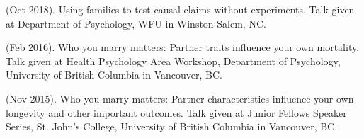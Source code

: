 \begin{etaremune}
%
%
\item\meb (Oct 2018). Using families to test causal claims without experiments. Talk given at Department of Psychology, WFU in Winston-Salem, NC.
%
\item \meb (Feb 2016). Who you marry matters: Partner traits influence your own mortality. Talk given at Health Psychology Area Workshop, Department of Psychology, University of British Columbia in Vancouver, BC. 
%
\item \meb (Nov 2015). Who you marry matters: Partner characteristics influence your own longevity and other important outcomes. Talk given at Junior Fellows Speaker Series, St. John's College, University of British Columbia in Vancouver, BC. \smallskip
\end{etaremune}%
